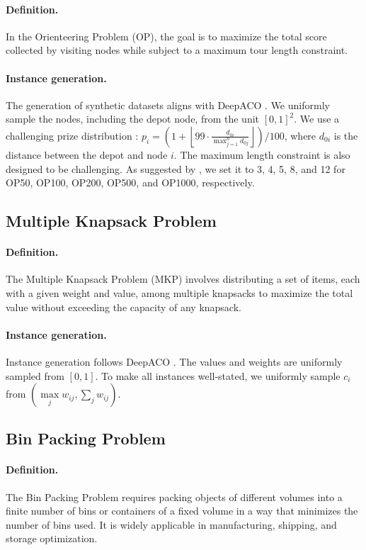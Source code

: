 \paragraph{Definition.}
In the Orienteering Problem (OP), the goal is to maximize the total score collected by visiting nodes while subject to a maximum tour length constraint.

\paragraph{Instance generation.}
The generation of synthetic datasets aligns with DeepACO \cite{ye2023deepaco}. We uniformly sample the nodes, including the depot node, from the unit $[0,1]^2$. We use a challenging prize distribution \cite{kool2019attention}: $p_i = (1+\left\lfloor 99 \cdot \frac{d_{0 i}}{\max _{j=1}^{n} d_{0 j}}\right\rfloor) / 100$, where $d_{0i}$ is the distance between the depot and node $i$. The maximum length constraint is also designed to be challenging. As suggested by \citet{kool2019attention}, we set it to 3, 4, 5, 8, and 12 for OP50, OP100, OP200, OP500, and OP1000, respectively.


\subsection{Multiple Knapsack Problem}
\paragraph{Definition.}
The Multiple Knapsack Problem (MKP) involves distributing a set of items, each with a given weight and value, among multiple knapsacks to maximize the total value without exceeding the capacity of any knapsack.

\paragraph{Instance generation.}
Instance generation follows DeepACO \cite{ye2023deepaco}. The values and weights are uniformly sampled from $[0, 1]$. To make all instances well-stated, we uniformly sample $c_i$ from $(\max\limits_j w_{ij}, \sum\limits_j w_{ij})$.


\subsection{Bin Packing Problem}
\paragraph{Definition.}
The Bin Packing Problem requires packing objects of different volumes into a finite number of bins or containers of a fixed volume in a way that minimizes the number of bins used. It is widely applicable in manufacturing, shipping, and storage optimization.

